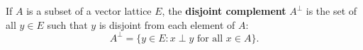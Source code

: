 If $A$ is a subset of a vector lattice $E$, the \textbf{disjoint complement} $A^\perp$ is the set of all $y \in E$ such that $y$ is disjoint from each element of $A$:
$$A^\perp = \{y \in E : x \perp y \text{ for all } x \in A\}.$$
